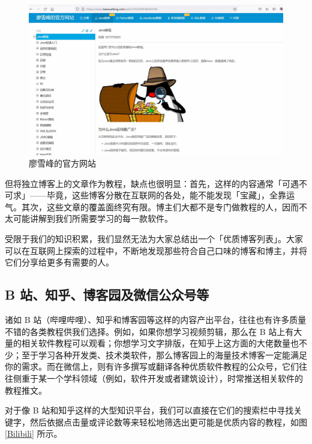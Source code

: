 \begin{figure}[htb!]
  \centering
  \includegraphics[width=12cm]{assets/Liao_Xuefeng.jpg}
  \caption{廖雪峰的官方网站}
  \label{Liao_Xuefeng}
\end{figure}

但将独立博客上的文章作为教程，缺点也很明显：首先，这样的内容通常「可遇不可求」——毕竟，这些博客分散在互联网的各处，能不能发现「宝藏」，全靠运气。其次，这些文章的覆盖面终究有限。博主们大都不是专门做教程的人，因而不太可能讲解到我们所需要学习的每一款软件。

受限于我们的知识积累，我们显然无法为大家总结出一个「优质博客列表」。大家可以在互联网上探索的过程中，不断地发现那些符合自己口味的博客和博主，并将它们分享给更多有需要的人。

\subsection{B 站、知乎、博客园及微信公众号等}

诸如 B 站（哔哩哔哩）、知乎和博客园等这样的内容产出平台，往往也有许多质量不错的各类教程供我们选择。例如，如果你想学习视频剪辑，那么在 B 站上有大量的相关软件教程可以观看；你想学习文字排版，在知乎上这方面的大佬数量也不少；至于学习各种开发类、技术类软件，那么博客园上的海量技术博客一定能满足你的需求。而在微信上，则有许多撰写或翻译各种优质软件教程的公众号，它们往往侧重于某一个学科领域（例如，软件开发或者建筑设计），时常推送相关软件的教程推文。

对于像 B 站和知乎这样的大型知识平台，我们可以直接在它们的搜索栏中寻找关键字，然后依据点击量或评论数等来轻松地筛选出更可能是优质内容的教程，如图 \ref{Bilibili} 所示。

